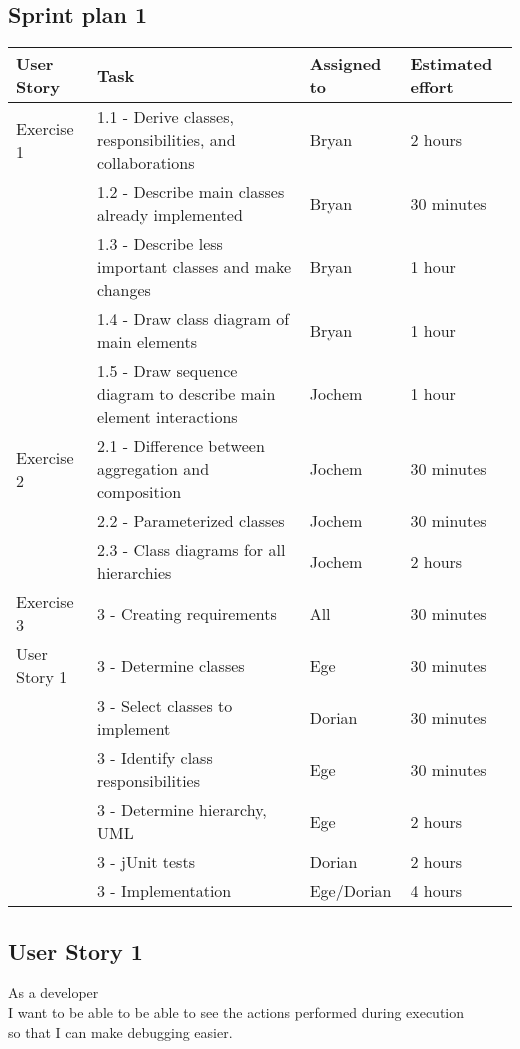\documentclass[10pt]{article}
\begin{document}
\begin{center}

\section*{Sprint plan 1}

    \begin{tabular}{ | p{2cm} | p{9cm} | p{2cm} | p{2cm} |}
    \hline
    User Story & Task & Assigned to & Estimated effort \\ \hline
    Exercise 1 & 1.1 - Derive classes, responsibilities, and collaborations & Bryan & 2 hours \\ 
    & 1.2 - Describe main classes already implemented & Bryan & 30 minutes \\
    & 1.3 - Describe less important classes and make changes & Bryan & 1 hour \\
    & 1.4 - Draw class diagram of main elements & Bryan & 1 hour \\
    & 1.5 - Draw sequence diagram to describe main element interactions & Jochem & 1 hour \\ \hline
    Exercise 2 & 2.1 - Difference between aggregation and composition & Jochem & 30 minutes \\ 
    & 2.2 - Parameterized classes & Jochem & 30 minutes \\
    & 2.3 - Class diagrams for all hierarchies & Jochem & 2 hours \\ \hline
    Exercise 3 & 3 - Creating requirements & All & 30 minutes \\ 
    User Story 1& 3 - Determine classes & Ege & 30 minutes \\ 
    & 3 - Select classes to implement & Dorian & 30 minutes \\
    & 3 - Identify class responsibilities & Ege & 30 minutes \\
    & 3 - Determine hierarchy, UML & Ege & 2 hours\\
    & 3 - jUnit tests & Dorian & 2 hours\\
    & 3 - Implementation & Ege/Dorian & 4 hours\\ \hline
    \end{tabular}
\end{center}

\subsection*{User Story 1}
As a developer\\ 
\indent I want to be able to be able to see the actions performed during execution\\
so that I can make debugging easier.
\end{document}
